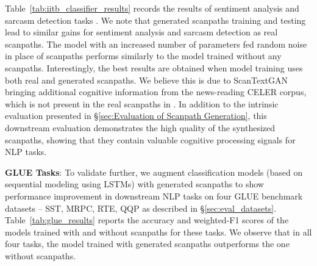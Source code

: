 Table~\ref{tab:iitb_classifier_results} records the results of sentiment analysis and sarcasm detection tasks \cite{mishra2016predicting}. We note that generated scanpaths training and testing lead to similar gains for sentiment analysis and sarcasm detection as real scanpaths. The model with an increased number of parameters fed random noise in place of scanpaths performs similarly to the model trained without any scanpaths. Interestingly, the best results are obtained when model training uses both real and generated scanpaths. We believe this is due to ScanTextGAN bringing additional cognitive information from the news-reading CELER corpus, which is not present in the real scanpaths in \cite{mishra2016predicting}. In addition to the intrinsic evaluation presented in \S\ref{sec:Evaluation of Scanpath Generation}, this downstream evaluation demonstrates the high quality of the synthesized scanpaths, showing that they contain valuable cognitive processing signals for NLP tasks.


\textbf{GLUE Tasks}:
To validate further, we augment classification models (based on sequential modeling using LSTMs) with generated scanpaths to show performance improvement in downstream NLP tasks on four GLUE benchmark datasets – SST, MRPC, RTE, QQP as described in \S\ref{sec:eval_datasets}.
Table~\ref{tab:glue_results} reports the accuracy and weighted-F1 scores of the models trained with and without scanpaths for these tasks. We observe that in all four tasks, the model trained with generated scanpaths outperforms the one without scanpaths. 




